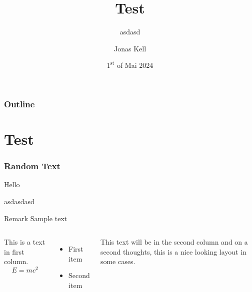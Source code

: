 \documentclass{beamer}
\title[asd]{Test}
\subtitle{asdasd}
\author{Jonas Kell}
\institute[TP III]{Chair for theoretical Physics III}
\date[01.05.2024]{$1^{\text{st}}$ of Mai 2024}
\begin{document}
\maketitle

\begin{frame}
    \frametitle{Outline}

    \tableofcontents

\end{frame}

\section{Test}

\begin{frame}
    \frametitle{Random Text}

    Hello
    
    asdasdasd
\end{frame}

\begin{frame}
    \begin{block}{Remark}
        Sample text
    \end{block}
\end{frame}

\begin{frame}
    \begin{columns}
            This is a text in first column.
            $$E=mc^2$$
            \begin{itemize}
                \item First item
                \item Second item
            \end{itemize}
        
            This text will be in the second column
            and on a second thoughts, this is a nice looking
            layout in some cases.
    \end{columns}
\end{frame}
\end{document}
